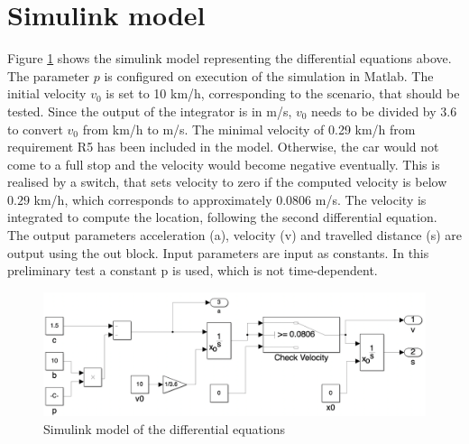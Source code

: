\section{Simulink model}\label{sec:D2_model}
Figure \ref{fig:D2_Sim} shows the simulink model representing the differential equations above.
The parameter $p$ is configured on execution of the simulation in Matlab.
The initial velocity $v_0$ is set to 10 km/h, corresponding to the scenario, that should be tested.
Since the output of the integrator is in m/s, $v_0$ needs to be divided by $3.6$ to convert $v_0$ from km/h to m/s.
The minimal velocity of 0.29 km/h from requirement R5 has been included in the model.
Otherwise, the car would not come to a full stop and the velocity would become negative eventually.
This is realised by a switch, that sets velocity to zero if the computed velocity is below $0.29$ km/h, which corresponds to approximately $0.0806$ m/s.
The velocity is integrated to compute the location, following the second differential equation.
The output parameters acceleration (a), velocity (v) and travelled distance (s) are output using the out block.
Input parameters are input as constants.
In this preliminary test a constant p is used, which is not time-dependent.
\begin{figure}[H]
\centering
\includegraphics[width=1\textwidth]{images/D2_sim.png}
\caption{Simulink model of the differential equations}
\label{fig:D2_Sim}
\end{figure}

